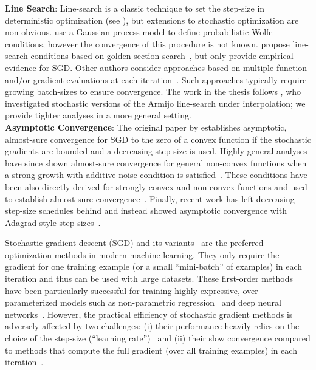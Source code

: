 \noindent \textbf{Line Search}:
Line-search is a classic technique to set the step-size in deterministic optimization (see \citet{nocedal1999numerical}), but extensions to stochastic optimization are non-obvious. 
\citet{mahsereci2017pls} use a Gaussian process model to define probabilistic Wolfe conditions, however the convergence of this procedure is not known.
\citet{fridovich2019choosing} propose line-search conditions based on golden-section search~\citep{avriel1968golden}, but only provide empirical evidence for \ac{SGD}. 
Other authors consider approaches based on multiple function and/or gradient evaluations at each iteration~\citep{friedlander2012hybrid, byrd2012sample, de2016big, krejic2013line, paquette2020stochastic}.
Such approaches typically require growing batch-sizes to ensure convergence.
The work in the thesis follows \citet{vaswani2019painless}, who investigated stochastic versions of the Armijo line-search under interpolation; we provide tighter analyses in a more general setting.\\ 


\noindent \textbf{Asymptotic Convergence}:
The original paper by \citet{robbins1951sgd} establishes asymptotic, almost-sure convergence for \ac{SGD} to the zero of a convex function if the stochastic gradients are bounded and a decreasing step-size is used.
Highly general analyses have since shown almost-sure convergence for general non-convex functions when a strong growth with additive noise condition is satisfied~\citep{bertsekas2000gradient, bottou1991approche}.
These conditions have been also directly derived for strongly-convex and non-convex functions and used to establish almost-sure convergence~\citep{nguyen2018sgd, lei2019stochastic}.
Finally, recent work has left decreasing step-size schedules behind and instead showed asymptotic convergence with Adagrad-style step-sizes~\citep{li2019convergence}.

\newpage

\iffalse

Stochastic gradient descent (SGD) and its variants~\cite{duchi2011adagrad,zeiler2012adadelta,kingma2015adam,tieleman2012rmsprop,schmidt2017sag,johnson2013svrg,defazio2014saga} are the preferred optimization methods in modern machine learning. They only require the gradient for one training example (or a small ``mini-batch'' of examples) in each iteration and thus can be used with large datasets. These first-order methods have been particularly successful for training highly-expressive, over-parameterized models such as non-parametric regression~\cite{liang2018just,belkin2019does} and deep neural networks~\cite{bengio2012practical,zhang2016understanding}. However, the practical efficiency of stochastic gradient methods is adversely affected by two challenges: (i) their performance heavily relies on the choice of the step-size (``learning rate'')~\cite{bengio2012practical, schaul2013no} and (ii) their slow convergence compared to methods that compute the full gradient (over all training examples) in each iteration~\cite{nesterov2013introductory}. 

